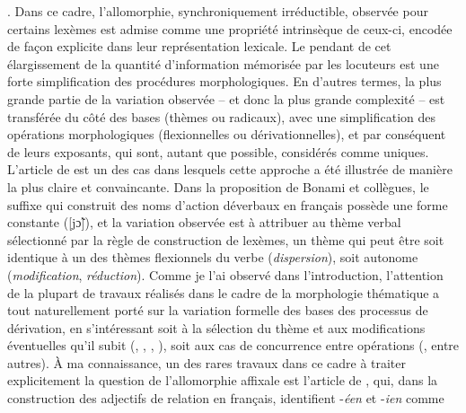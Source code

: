 \documentclass[output=paper]{langsci/langscibook}
\begin{document}
%
. Dans ce cadre,
l'allomorphie, synchroniquement irréductible, observée pour certains
lexèmes est admise comme une propriété intrinsèque de ceux-ci, encodée
de façon explicite dans leur représentation lexicale. Le pendant de cet
élargissement de la quantité d'information mémorisée par les locuteurs
est une forte simplification des procédures morphologiques. En d'autres
termes, la plus grande partie de la variation observée -- et donc la
plus grande complexité -- est transférée du côté des bases (thèmes ou
radicaux), avec une simplification des opérations morphologiques
(flexionnelles ou dérivationnelles), et par conséquent de leurs
exposants, qui sont, autant que possible, considérés comme uniques.
L'article de %
\citet{Bonami2009b} %
%
%
est un des cas dans lesquels
cette approche a été illustrée de manière la plus claire et
convaincante. Dans la proposition de Bonami et collègues, le suffixe qui
construit des noms d'action déverbaux en français possède une forme
constante ({[}jɔ̃{]}), et la variation observée est à attribuer au thème
verbal sélectionné par la règle de construction de lexèmes, un thème qui
peut être soit identique à un des thèmes flexionnels du verbe
(\emph{dispersion}), soit autonome (\emph{modification},
\emph{réduction}). Comme je l'ai observé dans l'introduction,
l'attention de la plupart de travaux réalisés dans le cadre de la
morphologie thématique a tout naturellement porté sur la variation
formelle des bases des processus de dérivation, en s'intéressant soit à
la sélection du thème et aux modifications éventuelles qu'il subit
%
(\citealt{Plenat2008b}, \citealt{Roche10}, \citealt{roche2014.CMLF}, \citealt{hathout2014.imm15}), soit aux cas de concurrence entre opérations %
(\citealt{Lignon09,Lignon2013,KoehlAurore2014,Roche16}, entre autres). À ma connaissance, un des rares travaux dans ce cadre à traiter
explicitement la question de l'allomorphie affixale est l'article de
%
\citet{LignonStephanie2011}%
%
, qui, dans la construction des adjectifs de
relation en français, identifient -\emph{éen} et -\emph{ien} comme
\end{document}
